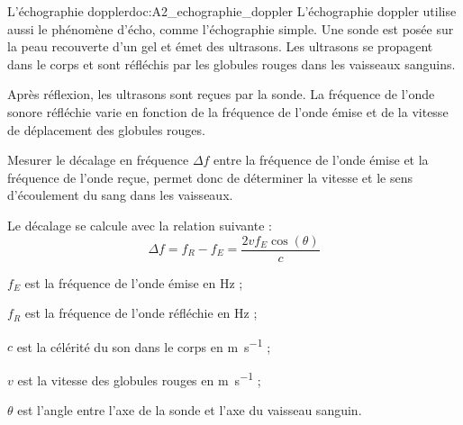 \begin{doc}{L'échographie doppler}{doc:A2_echographie_doppler}
  L'échographie doppler utilise aussi le phénomène d'écho, comme l'échographie simple.
  Une sonde est posée sur la peau recouverte d'un gel et émet des ultrasons.
  Les ultrasons se propagent dans le corps et sont réfléchis par les globules rouges dans les vaisseaux sanguins.

  Après réflexion, les ultrasons sont reçues par la sonde.
  La fréquence de l'onde sonore réfléchie varie en fonction de la fréquence de l'onde émise et de la vitesse de déplacement des globules rouges.

  \begin{center}
  \end{center}

  Mesurer le décalage en fréquence $\Delta f$ entre la fréquence de l'onde émise et la fréquence de l'onde reçue, permet donc de déterminer la vitesse et le sens d'écoulement du sang dans les vaisseaux.

  \begin{importants}
    Le décalage se calcule avec la relation suivante :
    \begin{equation*}
      \Delta f = f_R - f_E = \dfrac{2vf_E \cos(\theta)}{c}
    \end{equation*}
  \end{importants}
  \begin{multicols}{2}
    \begin{listePoints}
      \item $f_E$ est la fréquence de l'onde émise en \unit{\hertz} ;
      \item $f_R$ est la fréquence de l'onde réfléchie en \unit{\hertz} ;
      \item $c$ est la célérité du son dans le corps en \unit{\m\per\s} ;
      \item $v$ est la vitesse des globules rouges en \unit{\m\per\s} ;
      \item $\theta$ est l'angle entre l'axe de la sonde et l'axe du vaisseau sanguin.
    \end{listePoints}
  \end{multicols}
\end{doc}




